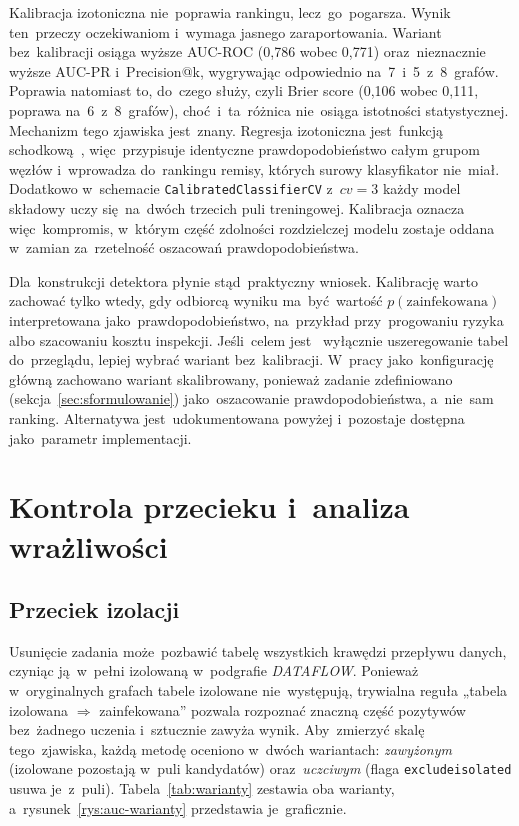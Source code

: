 \documentclass[polish,master,a4paper,oneside]{ppfcmthesis}
\renewcommand{\_}{\origtextunderscore\ifmmode\else\allowbreak\fi}
\begin{document}
Kalibracja izotoniczna nie~poprawia rankingu, lecz~go~pogarsza. Wynik
ten~przeczy oczekiwaniom i~wymaga jasnego zaraportowania. Wariant bez~kalibracji
osiąga wyższe AUC-ROC (0{,}786 wobec 0{,}771) oraz~nieznacznie
wyższe AUC-PR i~Precision@k, wygrywając odpowiednio na~7~i~5~z~8~grafów.
Poprawia natomiast to, do~czego służy, czyli Brier score (0{,}106 wobec
0{,}111, poprawa na~6~z~8~grafów), choć~i~ta~różnica nie~osiąga istotności
statystycznej. Mechanizm tego zjawiska jest~znany. Regresja izotoniczna jest~funkcją
schodkową~\cite{Zadrozny2002,Niculescu2005}, więc~przypisuje identyczne
prawdopodobieństwo całym grupom węzłów i~wprowadza do~rankingu remisy,
których surowy klasyfikator nie~miał. Dodatkowo w~schemacie \texttt{CalibratedClassifierCV} z~$cv = 3$
każdy model składowy uczy się~na~dwóch trzecich puli treningowej. Kalibracja
oznacza więc~kompromis, w~którym część zdolności rozdzielczej modelu zostaje
oddana w~zamian za~rzetelność oszacowań prawdopodobieństwa.

Dla~konstrukcji detektora płynie stąd~praktyczny wniosek. Kalibrację warto
zachować tylko wtedy, gdy odbiorcą wyniku ma~być~wartość
$p(\text{zainfekowana})$ interpretowana jako~prawdopodobieństwo, na~przykład
przy~progowaniu ryzyka albo szacowaniu kosztu inspekcji. Jeśli~celem jest~
wyłącznie uszeregowanie tabel do~przeglądu, lepiej wybrać wariant
bez~kalibracji. W~pracy jako~konfigurację główną zachowano wariant
skalibrowany, ponieważ zadanie zdefiniowano (sekcja~\ref{sec:sformulowanie})
jako~oszacowanie prawdopodobieństwa, a~nie~sam ranking. Alternatywa
jest~udokumentowana powyżej i~pozostaje dostępna jako~parametr
implementacji.

\section{Kontrola przecieku i~analiza wrażliwości}
\label{sec:przeciek}

\subsection{Przeciek izolacji}

Usunięcie zadania może~pozbawić tabelę wszystkich krawędzi przepływu
danych, czyniąc ją~w~pełni izolowaną w~podgrafie \emph{DATA\_FLOW}. Ponieważ
w~oryginalnych grafach tabele izolowane nie~występują, trywialna reguła
„tabela izolowana $\Rightarrow$ zainfekowana'' pozwala rozpoznać znaczną część
pozytywów bez~żadnego uczenia i~sztucznie zawyża wynik. Aby~zmierzyć skalę
tego~zjawiska, każdą metodę oceniono w~dwóch wariantach: \emph{zawyżonym}
(izolowane pozostają w~puli kandydatów) oraz~\emph{uczciwym} (flaga
\texttt{exclude\_isolated} usuwa je~z~puli). Tabela~\ref{tab:warianty}
zestawia oba warianty, a~rysunek~\ref{rys:auc-warianty} przedstawia je~graficznie.
\end{document}
